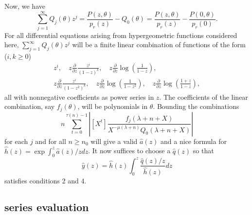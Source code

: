 \documentclass[10pt]{article}
\numberwithin{equation}{section}
\begin{document}
Now, we have
\begin{equation*}
\sum_{j=1}^{\infty} Q_j(\theta) z^j = \frac{P(z,\theta)}{p_r(z)} - Q_0(\theta)
= \frac{P(z,\theta)}{p_r(z)} - \frac{P(0,\theta)}{p_r(0)} \text{.}
\end{equation*}
For all differential equations arising from hypergeometric functions considered here, $\sum_{j=1}^{\infty} Q_j(\theta) z^j$ will be a finite linear combination of functions of the form ($i, k \ge 0$)
\begin{gather*}
z^i, \quad z \frac{\partial}{\partial z} \frac{z^i}{(1-z)^k}, \quad
z \frac{\partial}{\partial z} \log \left( \frac{1}{1-z} \right),\\
z \frac{\partial}{\partial z} \frac{z^i}{(1-z^2)^k}, \quad
z \frac{\partial}{\partial z} \log \left( \frac{1}{1-z^2} \right), \quad
z \frac{\partial}{\partial z} \log \left( \frac{1+z}{1-z} \right),
\end{gather*}
all with nonnegative coefficients as power series in $z$. The coefficients of the linear combination, say $f_j(\theta)$, will be polynomials in $\theta$. Bounding the combinations
\begin{equation*}
n \sum_{t=0}^{\tau(n) - 1} \left| [X^t] \frac{f_j(\lambda+n+X)}{X^{-\mu(\lambda+n)} Q_0(\lambda+n+X)} \right|
\end{equation*}
for each $j$ and for all $n \ge n_0$ will give a valid $\hat{a}(z)$ and a nice formula for $\hat{h}(z) = \exp \int_0^z \hat{a}(z)/z dz$. It now suffices to choose a $\hat{q}(z)$ so that
\begin{equation*}
\hat{y}(z)=\hat{h}(z) \int_0^z \frac{\hat{q}(z)/z}{\hat{h}(z)}{dz}
\end{equation*}
satisfies conditions 2 and 4.

\subsection{series evaluation}
\end{document}
